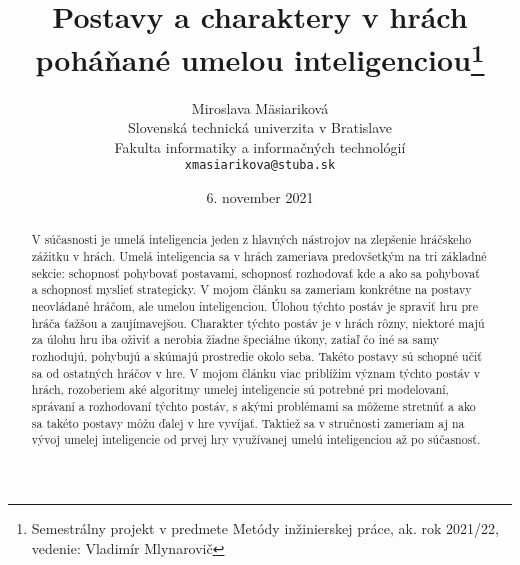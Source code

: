 \documentclass[10pt,twoside,slovak,a4paper]{article}
\title{Postavy a charaktery v hrách poháňané umelou inteligenciou\thanks{Semestrálny projekt v predmete Metódy inžinierskej práce, ak. rok 2021/22, vedenie: Vladimír Mlynarovič}} %
\author{Miroslava Mäsiariková\\[2pt]
	{\small Slovenská technická univerzita v Bratislave}\\
	{\small Fakulta informatiky a informačných technológií}\\
	{\small \texttt{xmasiarikova@stuba.sk}}
	}
\date{\small 6. november 2021} %
\begin{document}
\maketitle

\begin{abstract}

V súčasnosti je umelá inteligencia jeden z hlavných nástrojov na zlepšenie hráčskeho zážitku v hrách. Umelá inteligencia sa v hrách zameriava predovšetkým na tri základné sekcie: schopnosť pohybovať postavami, schopnosť rozhodovať kde a ako sa pohybovať a schopnosť myslieť strategicky. V mojom článku sa zameriam konkrétne na postavy neovládané hráčom, ale umelou inteligenciou. Úlohou týchto postáv je spraviť hru pre hráča ťažšou a zaujímavejšou. Charakter týchto postáv je v hrách rôzny, niektoré majú za úlohu hru iba oživiť a nerobia žiadne špeciálne úkony, zatiaľ čo iné sa samy rozhodujú, pohybujú a skúmajú prostredie okolo seba. Takéto postavy sú schopné učiť sa od ostatných hráčov v hre. V mojom článku viac priblížim význam týchto postáv v hrách, rozoberiem aké algoritmy umelej inteligencie sú potrebné pri modelovaní, správaní a rozhodovaní týchto postáv, s akými problémami sa môžeme stretnúť a ako sa takéto postavy môžu ďalej v hre vyvíjať. Taktiež sa v stručnosti zameriam aj na vývoj umelej inteligencie od prvej hry využívanej umelú inteligenciou až po súčasnosť. 

\end{abstract}
\end{document}
